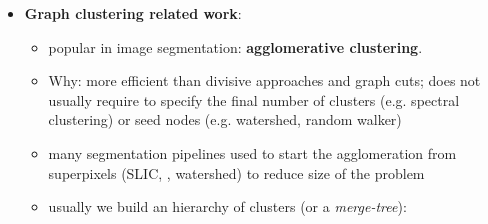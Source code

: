 \begin{itemize}
\item \textbf{Graph clustering related work}:
\begin{itemize}
    \item popular in image segmentation: \textbf{agglomerative clustering}.
    \item Why: more efficient than divisive approaches and graph cuts; does not usually require to specify the final number of clusters (e.g. spectral clustering) or seed nodes (e.g. watershed, random walker) 
    \item many segmentation pipelines used to start the agglomeration from superpixels (SLIC, \cite{felzenszwalb2004efficient}, watershed) to reduce size of the problem 
    \item usually we build an hierarchy of clusters (or a \emph{merge-tree}): 

 
\begin{itemize}


\end{itemize}
\end{itemize}
\end{itemize}
